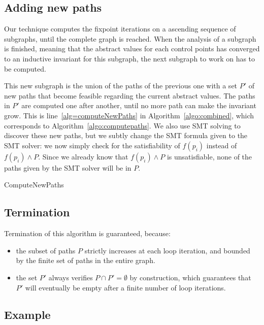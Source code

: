 \documentclass[preprint]{sigplanconf}
\begin{document}
\subsection{Adding new paths}
\label{subsec:addingpaths}

Our technique computes the fixpoint iterations on a ascending sequence of
subgraphs, until the complete graph is reached.
When the analysis of a subgraph is finished, meaning that the abstract values
for each control points has converged to an inductive invariant for this subgraph,
the next subgraph to work on has to be computed.

This new subgraph is the union of the paths of the previous one with a set
$P'$ of new paths that become feasible regarding the current abstract values.
The paths in $P'$ are computed one after another, until no more path
can make the invariant grow. This is line~\ref{alg=computeNewPaths} in
Algorithm~\ref{algo:combined}, which corresponds to
Algorithm~\ref{algo:computepaths}. We also use SMT solving to discover
these new paths, but we subtly change the SMT formula given to the
SMT solver: we now simply check for the satisfiability of $f(p_i)$
instead of $f(p_i) \wedge P$. Since we already know that $f(p_i)
\wedge P$ is unsatisfiable, none of the paths given by the SMT solver
will be in $P$.

\begin{algorithm}
	\caption{ComputeNewPaths}
	\label{algo:computepaths}
	\begin{algorithmic}[1] 
	
	\end{algorithmic}
\end{algorithm}

\subsection{Termination}
Termination of this algorithm is guaranteed, because:
\begin{itemize}
\item 
the subset of paths $P$ strictly increases at each loop iteration, and bounded by the finite set of
paths in the entire graph. 
\item the set $P'$ always verifies $P \cap P' = \emptyset$ by construction, 
which guarantees that $P'$
will eventually be empty after a finite number of loop iterations.
\end{itemize}

\subsection{Example}
\end{document}
